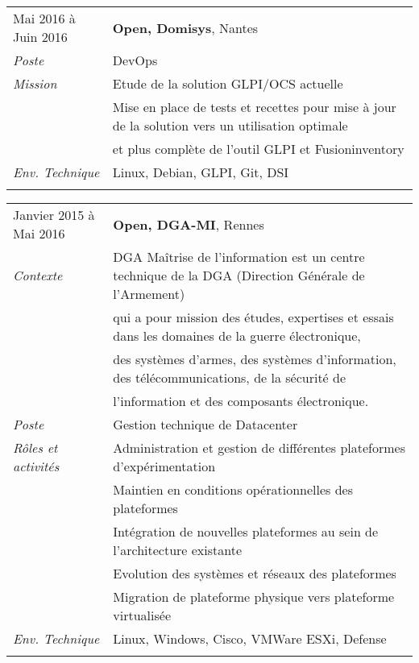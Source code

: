 \documentclass[a4paper,8pt]{article}
\begin{document}
\begin{tabular}{P{3.5cm}|p{13cm}}
Mai 2016 à Juin 2016		& \textbf{Open, Domisys}, Nantes\\
\textsl{Poste}			& DevOps\\
\textsl{Mission}		& Etude de la solution GLPI/OCS actuelle\\
				& Mise en place de tests et recettes pour mise à jour de la solution vers un utilisation optimale\\
				& et plus complète de l'outil GLPI et Fusioninventory\\
\textsl{Env. Technique}		& Linux, Debian, GLPI, Git, DSI \\
 & \\
\end{tabular}

\begin{tabular}{P{3.5cm}|p{13cm}}
Janvier 2015 à Mai 2016		& \textbf{Open, DGA-MI}, Rennes\\
\textsl{Contexte}      		& DGA Maîtrise de l'information est un centre technique de la DGA (Direction Générale de l'Armement)\\
				& qui a pour mission des études, expertises et essais dans les domaines de la guerre électronique,\\
				& des systèmes d'armes, des systèmes d'information, des télécommunications, de la sécurité de \\
				& l'information et des composants électronique.\\
\textsl{Poste}			& Gestion technique de Datacenter\\
\textsl{Rôles et activités}	& Administration et gestion de différentes plateformes d'expérimentation\\
				& Maintien en conditions opérationnelles des plateformes\\
				& Intégration de nouvelles plateformes au sein de l'architecture existante\\
				& Evolution des systèmes et réseaux des plateformes\\
				& Migration de plateforme physique vers plateforme virtualisée\\
\textsl{Env. Technique}		& Linux, Windows, Cisco, VMWare ESXi, Defense\\
 & \\
\end{tabular}
\end{document}

